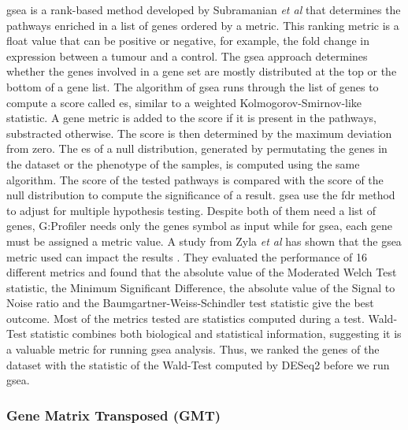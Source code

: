 \acrshort{gsea} is a rank-based method developed by Subramanian \textit{et al} \cite*{Subramanian2005} that determines the pathways enriched in a list of genes ordered by a metric.
This ranking metric is a float value that can be positive or negative, for example, the fold change in expression between a tumour and a control.
The \acrshort{gsea} approach determines whether the genes involved in a gene set are mostly distributed at the top or the bottom of a gene list.
The algorithm of \acrshort{gsea} runs through the list of genes to compute a score called  \acrfull{es}, similar to a weighted Kolmogorov-Smirnov-like statistic.
A gene metric is added to the score if it is present in the pathways, substracted otherwise.
The score is then determined by the maximum deviation from zero.
The \acrshort{es} of a null distribution, generated by permutating the genes in the dataset or the phenotype of the samples, is computed using the same algorithm.
The score of the tested pathways is compared with the score of the null distribution to compute the significance of a result.
\acrshort{gsea} use the \acrshort{fdr} method to adjust for multiple hypothesis testing.
Despite both of them need a list of genes, G:Profiler needs only the genes symbol as input while for \acrshort{gsea}, each gene must be assigned a metric value.
A study from Zyla \textit{et al} has shown that the \acrshort{gsea} metric used can impact the results \cite*{Zyla2017}.
They evaluated the performance of 16 different metrics and found that the absolute value of the Moderated Welch Test statistic, the Minimum Significant Difference, the absolute value of the Signal to Noise ratio and the Baumgartner-Weiss-Schindler test statistic give the best outcome.
Most of the metrics tested are statistics computed during a test.
Wald-Test statistic combines both biological and statistical information, suggesting it is a valuable metric for running \acrshort{gsea} analysis.
Thus, we ranked the genes of the dataset with the statistic of the Wald-Test computed by DESeq2 before we run \acrshort{gsea}.

\subsubsection{Gene Matrix Transposed (GMT)}


